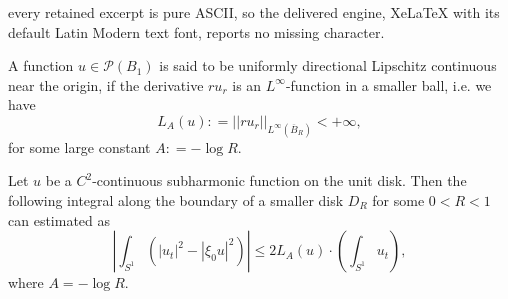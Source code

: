 \documentclass[10pt,a4paper]{amsart}
\def\cP{{\mathcal P}}
\begin{document}
every retained excerpt is pure ASCII, so the delivered engine, XeLaTeX with its default Latin Modern text font, reports no missing character.
\begin{defn}
\label{def-pre-003}
A function $u\in \cP(B_1)$ is said to be uniformly directional Lipschitz continuous near the origin,
if the derivative $ ru_r$ is an $L^{\infty}$-function in a smaller ball, i.e. 
we have 
$$ L_A(u): = || ru_r ||_{L^{\infty}(\overline{B}_R)} < +\infty, $$
for some large constant $A: = -\log R$. 
\end{defn}

\begin{lemma}
\label{lem-sub-002}
Let $u$ be a $C^2$-continuous subharmonic function on the unit disk.
Then the following integral along the boundary of a smaller disk $D_R$ for some $0< R <1$
can estimated as 
\begin{equation}
\label{sub-007}
\left| \int_{S^1} \left( |u_t|^2 - |\xi_0 u|^2 \right)  \right| \leq 2 L_A(u) \cdot \left( \int_{S^1} u_t \right), 
\end{equation}
where $A = -\log R$. 
\end{lemma}
\end{document}
